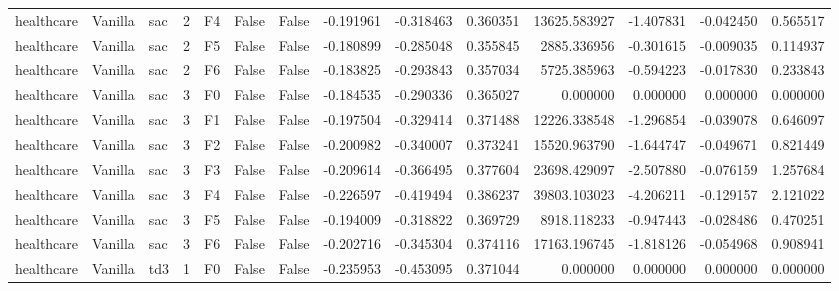 \begin{tabular}{lllrlllrrrrrrr}
healthcare & Vanilla &       sac &     2 &  F4 &           False &            False & -0.191961 & -0.318463 & 0.360351 &     13625.583927 &          -1.407831 &       -0.042450 &            0.565517 \\
healthcare & Vanilla &       sac &     2 &  F5 &           False &            False & -0.180899 & -0.285048 & 0.355845 &      2885.336956 &          -0.301615 &       -0.009035 &            0.114937 \\
healthcare & Vanilla &       sac &     2 &  F6 &           False &            False & -0.183825 & -0.293843 & 0.357034 &      5725.385963 &          -0.594223 &       -0.017830 &            0.233843 \\
healthcare & Vanilla &       sac &     3 &  F0 &           False &            False & -0.184535 & -0.290336 & 0.365027 &         0.000000 &           0.000000 &        0.000000 &            0.000000 \\
healthcare & Vanilla &       sac &     3 &  F1 &           False &            False & -0.197504 & -0.329414 & 0.371488 &     12226.338548 &          -1.296854 &       -0.039078 &            0.646097 \\
healthcare & Vanilla &       sac &     3 &  F2 &           False &            False & -0.200982 & -0.340007 & 0.373241 &     15520.963790 &          -1.644747 &       -0.049671 &            0.821449 \\
healthcare & Vanilla &       sac &     3 &  F3 &           False &            False & -0.209614 & -0.366495 & 0.377604 &     23698.429097 &          -2.507880 &       -0.076159 &            1.257684 \\
healthcare & Vanilla &       sac &     3 &  F4 &           False &            False & -0.226597 & -0.419494 & 0.386237 &     39803.103023 &          -4.206211 &       -0.129157 &            2.121022 \\
healthcare & Vanilla &       sac &     3 &  F5 &           False &            False & -0.194009 & -0.318822 & 0.369729 &      8918.118233 &          -0.947443 &       -0.028486 &            0.470251 \\
healthcare & Vanilla &       sac &     3 &  F6 &           False &            False & -0.202716 & -0.345304 & 0.374116 &     17163.196745 &          -1.818126 &       -0.054968 &            0.908941 \\
healthcare & Vanilla &       td3 &     1 &  F0 &           False &            False & -0.235953 & -0.453095 & 0.371044 &         0.000000 &           0.000000 &        0.000000 &            0.000000 \\

\end{tabular}
